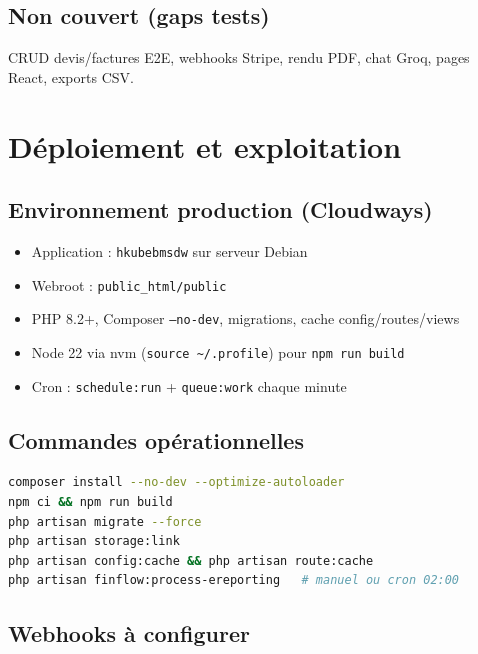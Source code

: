 \documentclass[11pt,a4paper]{report}
\newcommand{\filepath}[1]{\texttt{\small #1}}
\begin{document}
\section{Non couvert (gaps tests)}

CRUD devis/factures E2E, webhooks Stripe, rendu PDF, chat Groq, pages React, exports CSV.

\chapter{Déploiement et exploitation}

\section{Environnement production (Cloudways)}

\begin{itemize}[leftmargin=1.5em]
    \item Application : \texttt{hkubebmsdw} sur serveur Debian
    \item Webroot : \filepath{public\_html/public}
    \item PHP 8.2+, Composer \texttt{--no-dev}, migrations, cache config/routes/views
    \item Node 22 via nvm (\texttt{source \textasciitilde/.profile}) pour \texttt{npm run build}
    \item Cron : \texttt{schedule:run} + \texttt{queue:work} chaque minute
\end{itemize}

\section{Commandes opérationnelles}

\begin{lstlisting}[language=bash]
composer install --no-dev --optimize-autoloader
npm ci && npm run build
php artisan migrate --force
php artisan storage:link
php artisan config:cache && php artisan route:cache
php artisan finflow:process-ereporting   # manuel ou cron 02:00
\end{lstlisting}

\section{Webhooks à configurer}
\end{document}
